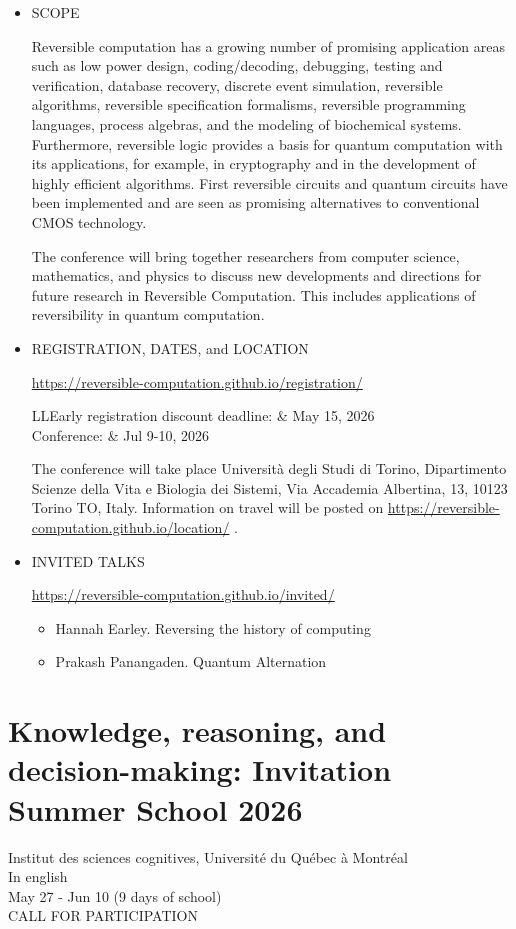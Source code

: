 \documentclass[prodmode,acmtecs]{acmsmall} %
\begin{document}
\begin{itemize}\item  SCOPE  
 
   Reversible computation has a growing number of promising application areas such as low power design, coding/decoding, debugging, testing and verification, database recovery, discrete event simulation, reversible algorithms, reversible specification formalisms, reversible programming languages, process algebras, and the modeling of biochemical systems. Furthermore, reversible logic provides a basis for quantum computation with its applications, for example, in cryptography and in the development of highly efficient algorithms. First reversible circuits and quantum circuits have been implemented and are seen as promising alternatives to conventional CMOS technology. 
 
  The conference will bring together researchers from computer science, mathematics, and physics to discuss new developments and directions for future research in Reversible Computation. This includes applications of reversibility in quantum computation. 
 
\item  REGISTRATION, DATES, and LOCATION  
 
  \href{https://reversible-computation.github.io/registration/}{https://reversible-computation.github.io/registration/} 
 
\begin{tabulary}{\linewidth}{LL}Early registration discount deadline:  & May 15, 2026 \\
Conference:  & Jul 9-10, 2026 \\
\end{tabulary}
 
  The conference will take place Università degli Studi di Torino, Dipartimento Scienze della Vita e Biologia dei Sistemi, Via Accademia Albertina, 13, 10123 Torino TO, Italy. Information on travel will be posted on \href{https://reversible-computation.github.io/location/}{https://reversible-computation.github.io/location/} . 
 
\item  INVITED TALKS  
 
  \href{https://reversible-computation.github.io/invited/}{https://reversible-computation.github.io/invited/} 
 
\begin{itemize}\item  Hannah Earley. Reversing the history of computing
\item  Prakash Panangaden. Quantum Alternation
\end{itemize} 
\end{itemize}\section{Knowledge, reasoning, and decision-making: Invitation Summer School 2026}\label{Knowledgereasoninganddecisionmaking}   Institut des sciences cognitives, Université du Québec à Montréal\\ 
  In english\\ 
  May 27 - Jun 10 (9 days of school)\\ 
CALL FOR PARTICIPATION 
\end{document}
